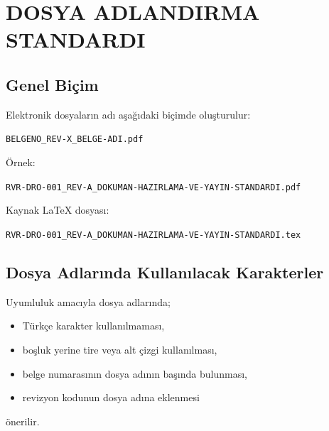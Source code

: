 \documentclass[11pt,a4paper]{article}
\begin{document}

\newpage

\section{DOSYA ADLANDIRMA STANDARDI}

\subsection{Genel Biçim}

Elektronik dosyaların adı aşağıdaki biçimde oluşturulur:

\begin{center}

\texttt{BELGENO\_REV-X\_BELGE-ADI.pdf}

\end{center}

Örnek:

\begin{ornek}
\texttt{RVR-DRO-001\_REV-A\_DOKUMAN-HAZIRLAMA-VE-YAYIN-STANDARDI.pdf}
\end{ornek}

Kaynak LaTeX dosyası:

\begin{ornek}
\texttt{RVR-DRO-001\_REV-A\_DOKUMAN-HAZIRLAMA-VE-YAYIN-STANDARDI.tex}
\end{ornek}

\subsection{Dosya Adlarında Kullanılacak Karakterler}

Uyumluluk amacıyla dosya adlarında;

\begin{itemize}
    \item Türkçe karakter kullanılmaması,
    \item boşluk yerine tire veya alt çizgi kullanılması,
    \item belge numarasının dosya adının başında bulunması,
    \item revizyon kodunun dosya adına eklenmesi
\end{itemize}

önerilir.

\end{document}
